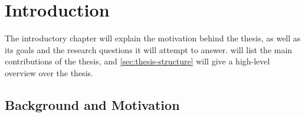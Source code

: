 \chapter{Introduction}
\label{cha:introduction}

\begin{comment}
All chapters should begin with an introduction before any sections, giving an overview of the chapter content.
Each section should in addition start with an introduction before its subsections begin.
Chapters with just one section --- or sections with just one sub-section --- should be avoided.
Think carefully about chapter and section titles as each title stands alone in the table of contents (without associated text)
and should convey the meaning of the contents of the chapter or section.

In all chapters and sections it is important to write clearly and concisely. Avoid repetitions and if needed refer back to the original discussion or presentation.
Each new section, subsection or paragraph should provide the reader with new information and be written in your own words. Avoid direct quotes.
If you use direct quotes, unless the quote itself is very significant, you are conveying to the reader that you are unable to express this discussion or fact yourself.
Such direct quotes also break the flow of the language (yours to someone else's).
\end{comment}

The introductory chapter will explain the motivation behind the thesis, as well as its goals and the research questions it will attempt to answer.  will list the main contributions of the thesis, and \autoref{sec:thesis-structure} will give a high-level overview over the thesis.

\section{Background and Motivation}
\label{sec:background-and-motivation}

